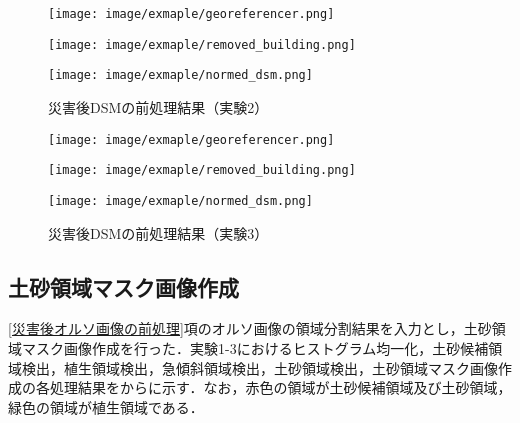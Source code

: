       \begin{figure}[t]
        \begin{minipage}[c]{0.329\hsize}
          \centering
          \texttt{[image: image/exmaple/georeferencer.png]}
        \end{minipage}
        \begin{minipage}[c]{0.329\hsize}
          \centering
          \texttt{[image: image/exmaple/removed\_building.png]}
        \end{minipage}
        \begin{minipage}[c]{0.329\hsize}
          \centering
          \texttt{[image: image/exmaple/normed\_dsm.png]}
        \end{minipage}
        \caption{災害後DSMの前処理結果（実験2）}
      \end{figure}

      \begin{figure}[t]
        \begin{minipage}[c]{0.329\hsize}
          \centering
          \texttt{[image: image/exmaple/georeferencer.png]}
        \end{minipage}
        \begin{minipage}[c]{0.329\hsize}
          \centering
          \texttt{[image: image/exmaple/removed\_building.png]}
        \end{minipage}
        \begin{minipage}[c]{0.329\hsize}
          \centering
          \texttt{[image: image/exmaple/normed\_dsm.png]}
        \end{minipage}
        \caption{災害後DSMの前処理結果（実験3）}
        \label{災害後DSMの前処理結果（実験3）}
      \end{figure}


    \subsection*{土砂領域マスク画像作成}
      \label{土砂領域マスク画像作成（実験）}
      \ref{災害後オルソ画像の前処理}項のオルソ画像の領域分割結果を入力とし，土砂領域マスク画像作成を行った．実験1-3におけるヒストグラム均一化，土砂候補領域検出，植生領域検出，急傾斜領域検出，土砂領域検出，土砂領域マスク画像作成の各処理結果をからに示す．なお，赤色の領域が土砂候補領域及び土砂領域，緑色の領域が植生領域である．

